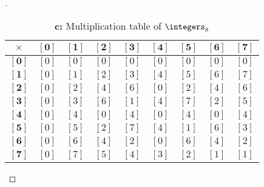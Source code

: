 \documentclass[paper=usletter, fontsize=12pt]{article}
\begin{document}
\begin{itemize}
\begin{itemize}
\begin{proof}[\unskip\nopunct]
                \begin{table}
                    \centering
                    \caption{\textbf{c:} Multiplication table of $\integers_8$}
                    \renewcommand{\arraystretch}{2.5}
                    \begin{tabular}{|c|c|c|c|c|c|c|c|c|}
\hline
$\bm{\times}$ & $\bm{[0]}$ & $\bm{[1]}$ & $\bm{[2]}$ & $\bm{[3]}$ & $\bm{[4]}$ & $\bm{[5]}$ & $\bm{[6]}$ & $\bm{[7]}$ \\
\hline
$\bm{[0]}$ & $[0]$ & $[0]$ & $[0]$ & $[0]$ & $[0]$ & $[0]$ & $[0]$ & $[0]$ \\
\hline
$\bm{[1]}$ & $[0]$ & $[1]$ & $[2]$ & $[3]$ & $[4]$ & $[5]$ & $[6]$ & $[7]$ \\
\hline
$\bm{[2]}$ & $[0]$ & $[2]$ & $[4]$ & $[6]$ & $[0]$ & $[2]$ & $[4]$ & $[6]$ \\
\hline
$\bm{[3]}$ & $[0]$ & $[3]$ & $[6]$ & $[1]$ & $[4]$ & $[7]$ & $[2]$ & $[5]$ \\
\hline
$\bm{[4]}$ & $[0]$ & $[4]$ & $[0]$ & $[4]$ & $[0]$ & $[4]$ & $[0]$ & $[4]$ \\
\hline
$\bm{[5]}$ & $[0]$ & $[5]$ & $[2]$ & $[7]$ & $[4]$ & $[1]$ & $[6]$ & $[3]$ \\
\hline
$\bm{[6]}$ & $[0]$ & $[6]$ & $[4]$ & $[2]$ & $[0]$ & $[6]$ & $[4]$ & $[2]$ \\
\hline
$\bm{[7]}$ & $[0]$ & $[7]$ & $[5]$ & $[4]$ & $[3]$ & $[2]$ & $[1]$ & $[1]$ \\
\hline
                    \end{tabular}
                \end{table}

            \end{proof}
            \newpage


\end{itemize}
\end{itemize}
\end{document}
